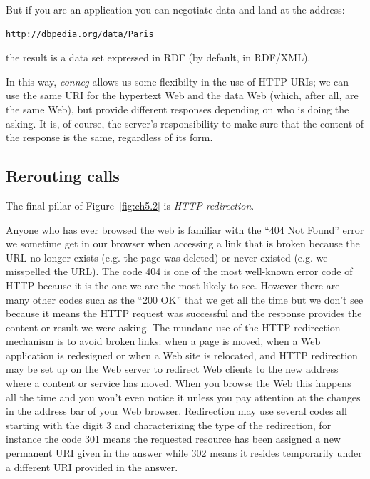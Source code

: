 But if you are an application you can negotiate data and land at the
address:

\begin{lstlisting}
http://dbpedia.org/data/Paris
\end{lstlisting}

the result is a data set expressed in RDF (by default, in RDF/XML).  

In this way, \emph{conneg} allows us some flexibilty in the use of HTTP URIs;  we can use 
the same URI for the hypertext Web and the data Web (which, after all, are the same Web), but
provide different responses depending on who is doing the asking.  It is, of course, the server's responsibility to make sure that the content of the response is the same, regardless of its form. 


\hypertarget{rerouting-calls}{%
\subsection{Rerouting calls}\label{rerouting-calls}}

The final pillar of Figure~\ref{fig:ch5.2} is  \emph{HTTP redirection}.

Anyone who has ever browsed the web is familiar with the ``404 Not Found'' error we sometime 
get in our browser
when accessing a link that is broken because the URL no longer exists
(e.g. the page was deleted) or never existed (e.g. we misspelled the
URL). The code 404 is one of the most well-known error code of HTTP
because it is the one we are the most likely to see. However there are
many other codes such as the ``200 OK'' that we get all the time but we
don't see because it means the HTTP request was successful and the
response provides the content or result we were asking. The mundane use
of the HTTP redirection mechanism is to avoid broken links: when a page
is moved, when a Web application is redesigned or when a Web site is
relocated, and HTTP redirection may be set up on the Web server to
redirect Web clients to the new address where a content or service has
moved. When you browse the Web this happens all the time and you won't
even notice it unless you pay attention at the changes in the address
bar of your Web browser. Redirection may use several codes all starting
with the digit 3 and characterizing the type of the redirection, for
instance the code 301 means the requested resource has been assigned a
new permanent URI given in the answer while 302 means it resides
temporarily under a different URI provided in the answer.

